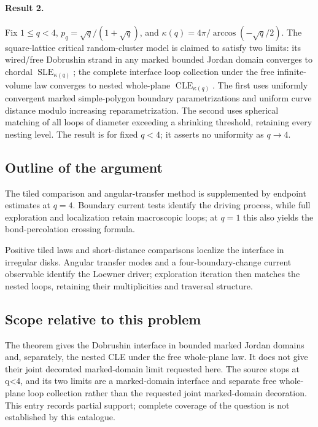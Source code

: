 \documentclass[11pt]{article}
\begin{document}
\paragraph{Result 2.} Fix \(1\le q<4\), \(p_q=\sqrt q/(1+\sqrt q)\), and \(\kappa(q)=4\pi/\arccos(-\sqrt q/2)\). The square-lattice critical random-cluster model is claimed to satisfy two limits: its wired/free Dobrushin strand in any marked bounded Jordan domain converges to chordal \(\operatorname{SLE}_{\kappa(q)}\); the complete interface loop collection under the free infinite-volume law converges to nested whole-plane \(\operatorname{CLE}_{\kappa(q)}\). The first uses uniformly convergent marked simple-polygon boundary parametrizations and uniform curve distance modulo increasing reparametrization. The second uses spherical matching of all loops of diameter exceeding a shrinking threshold, retaining every nesting level. The result is for fixed \(q<4\); it asserts no uniformity as \(q\to4\).

\subsection{Outline of the argument}
The tiled comparison and angular-transfer method is supplemented by endpoint estimates at $q=4$. Boundary current tests identify the driving process, while full exploration and localization retain macroscopic loops; at $q=1$ this also yields the bond-percolation crossing formula.

Positive tiled laws and short-distance comparisons localize the interface in irregular disks. Angular transfer modes and a four-boundary-change current observable identify the Loewner driver; exploration iteration then matches the nested loops, retaining their multiplicities and traversal structure.

\subsection{Scope relative to this problem}
The theorem gives the Dobrushin interface in bounded marked Jordan domains and, separately, the nested CLE under the free whole-plane law. It does not give their joint decorated marked-domain limit requested here. The source stops at q<4, and its two limits are a marked-domain interface and separate free whole-plane loop collection rather than the requested joint marked-domain decoration. This entry records partial support; complete coverage of the question is not established by this catalogue.
\end{document}
